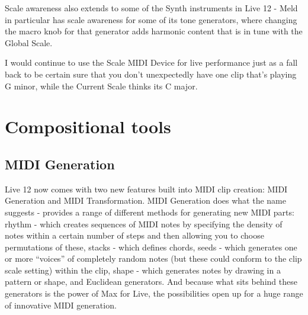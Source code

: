 \documentclass[
  12pt,
  letterpaper,
  oneside,
  open=any]{scrbook}
\begin{document}
Scale awareness also extends to some of the Synth instruments in Live 12
- Meld in particular has scale awareness for some of its tone
generators, where changing the macro knob for that generator adds
harmonic content that is in tune with the Global Scale.

\begin{tcolorbox}[enhanced jigsaw, colback=white, rightrule=.15mm, toprule=.15mm, arc=.35mm, opacitybacktitle=0.6, coltitle=black, leftrule=.75mm, bottomtitle=1mm, toptitle=1mm, left=2mm, bottomrule=.15mm, titlerule=0mm, colbacktitle=quarto-callout-caution-color!10!white, colframe=quarto-callout-caution-color-frame, title=\textcolor{quarto-callout-caution-color}{\faFire}\hspace{0.5em}{Continue to use Scale Device in live performance!}, breakable, opacityback=0]

I would continue to use the Scale MIDI Device for live performance just
as a fall back to be certain sure that you don't unexpectedly have one
clip that's playing G minor, while the Current Scale thinks its C major.

\end{tcolorbox}

\section{Compositional tools}\label{compositional-tools}

\subsection{MIDI Generation}\label{midi-generation}

Live 12 now comes with two new features built into MIDI clip creation:
MIDI Generation and MIDI Transformation. MIDI Generation does what the
name suggests - provides a range of different methods for generating new
MIDI parts: rhythm - which creates sequences of MIDI notes by specifying
the density of notes within a certain number of steps and then allowing
you to choose permutations of these, stacks - which defines chords,
seeds - which generates one or more ``voices'' of completely random
notes (but these could conform to the clip scale setting) within the
clip, shape - which generates notes by drawing in a pattern or shape,
and Euclidean generators. And because what sits behind these generators
is the power of Max for Live, the possibilities open up for a huge range
of innovative MIDI generation.
\end{document}
